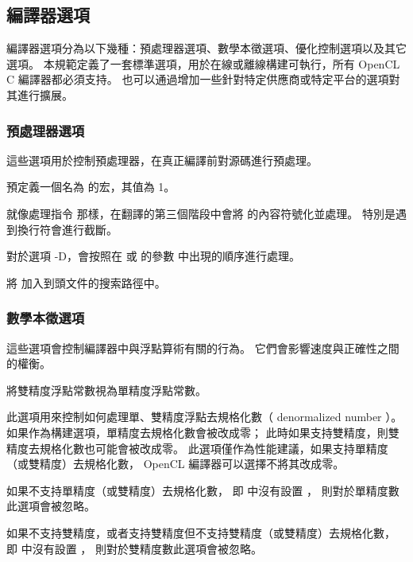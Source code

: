 \subsection{編譯器選項}

編譯器選項分為以下幾種：預處理器選項、數學本徵選項、優化控制選項以及其它選項。
本規範定義了一套標準選項，用於在線或離線構建可執行，所有 OpenCL C 編譯器都必須支持。
也可以通過增加一些針對特定供應商或特定平台的選項對其進行擴展。

\subsubsection{預處理器選項}
這些選項用於控制預處理器，在真正編譯前對源碼進行預處理。

預定義一個名為  的宏，其值為 1。
\stopclOption

就像處理指令  那樣，在翻譯的第三個階段中會將  的內容符號化並處理。
特別是遇到換行符會進行截斷。
\stopclOption

對於選項 -D，會按照在  或  的參數  中出現的順序進行處理。

將  加入到頭文件的搜索路徑中。
\stopclOption

\subsubsection[sec:MathIntrinsicsOption]{數學本徵選項}
這些選項會控制編譯器中與浮點算術有關的行為。
它們會影響速度與正確性之間的權衡。

將雙精度浮點常數視為單精度浮點常數。
\stopclOption

此選項用來控制如何處理單、雙精度浮點去規格化數（ denormalized number ）。
如果作為構建選項，單精度去規格化數會被改成零；
此時如果支持雙精度，則雙精度去規格化數也可能會被改成零。
此選項僅作為性能建議，如果支持單精度（或雙精度）去規格化數，
 OpenCL 編譯器可以選擇不將其改成零。

如果不支持單精度（或雙精度）去規格化數，
即  中沒有設置 ，
則對於單精度數此選項會被忽略。

如果不支持雙精度，或者支持雙精度但不支持雙精度（或雙精度）去規格化數，
即  中沒有設置 ，
則對於雙精度數此選項會被忽略。


